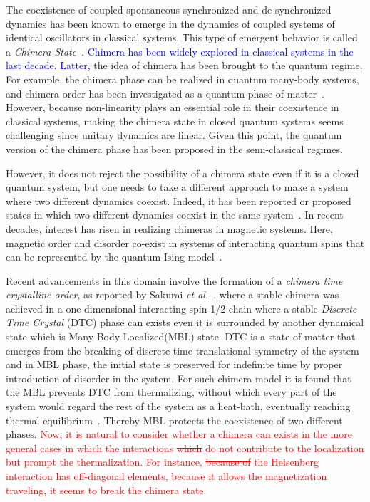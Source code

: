 \documentclass[
nofootinbib,
reprint,
superscriptaddress,
amsmath,amssymb,showkeys,
aps,
prb,
]{revtex4-2}
\newcommand{\red}[1]{\textcolor{red}{#1}}
\newcommand{\blue}[1]{\textcolor{blue}{#1}}
\begin{document}
	The coexistence of coupled spontaneous synchronized and de-synchronized  dynamics has been known to emerge in the dynamics of coupled systems of identical oscillators in classical systems. This type of emergent behavior is called a \textit{Chimera State}~\cite{kuramoto_coexistence_2002, panaggio_chimera_2015, parastesh_chimeras_2021}. \blue{Chimera has been widely explored in classical systems in the last decade.} \blue{Latter,} the idea of chimera has been brought to the quantum regime. For example, the chimera phase can be realized in quantum many-body systems, and chimera order has been investigated as a quantum phase of matter~\cite{bastidas_quantum_2015}. However, because non-linearity plays an essential role in their coexistence in classical systems, making the chimera state in closed quantum systems seems challenging since unitary dynamics are linear. Given this point, the quantum version of the chimera phase has been proposed in the semi-classical regimes.
	
	However, it does not reject the possibility of a chimera state even if it is a closed quantum system, but one needs to take a different approach to make a system where two different dynamics coexist. Indeed, it has been reported or proposed states in which two different dynamics coexist in the same system~\cite{Bastidas2018,Zha2020,sakurai_phys_nodate}. In recent decades, interest has risen in realizing chimeras in magnetic systems. Here, magnetic order and disorder co-exist in systems of interacting quantum spins that can be represented by the quantum Ising model~\cite{singh_chimera_2011}. 
	
	Recent advancements in this domain involve the formation of a \textit{chimera time crystalline order}, as reported by Sakurai \textit{et al.}~\cite{sakurai_phys_nodate}, where a stable chimera was achieved in a one-dimensional interacting spin-1/2 chain where a stable \textit{Discrete Time Crystal} (DTC) phase can exists even it is surrounded by another dynamical state which is Many-Body-Localized(MBL) state. DTC is a state of matter that emerges from the breaking of discrete time translational symmetry of the system~\cite{else_floquet_2016} and in MBL phase, the initial state is preserved for indefinite time by proper introduction of disorder in the system. For such chimera model it is found that the MBL prevents DTC from thermalizing, without which every part of the system
	would regard the rest of the system as a heat-bath, eventually reaching thermal equilibrium~\cite{zhang_observation_2017,alet_many-body_2018,else_floquet_2016,smith_many-body_2016,nguyen_signature_2021}. Thereby MBL protects the coexistence of two different phases. \red{Now, it is natural to consider whether a chimera can exists in the more general cases in which the interactions \sout{which} do not contribute to the localization but prompt the thermalization. For instance,  \sout{ because of } the Heisenberg interaction has off-diagonal elements, because it allows the magnetization traveling, it seems to break the chimera state.}
		
\end{document}
